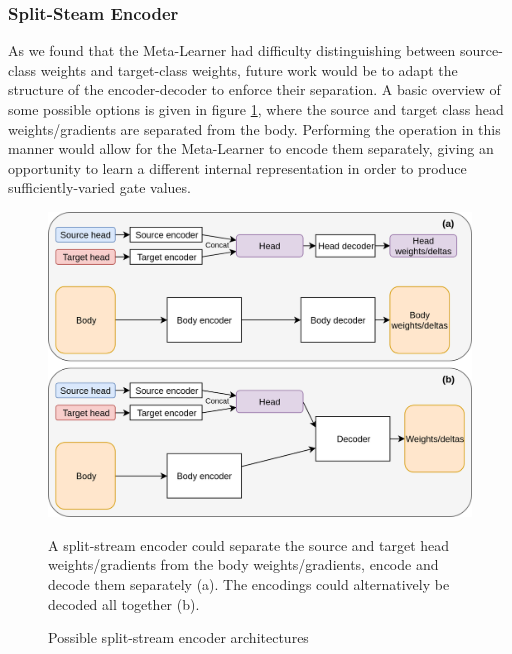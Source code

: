 \documentclass{report}
\begin{document}
\subsubsection{Split-Steam Encoder}
As we found that the Meta-Learner had difficulty distinguishing between source-class weights and target-class weights, future work would be to adapt the structure of the encoder-decoder to enforce their separation. A basic overview of some possible options is given in figure \ref{fig:split-stream:1}, where the source and target class head weights/gradients are separated from the body. Performing the operation in this manner would allow for the Meta-Learner to encode them separately, giving an opportunity to learn a different internal representation in order to produce sufficiently-varied gate values.

\begin{figure}[!h]
	\centering
	\includegraphics[width=13cm]{split-stream}
	\caption{Possible split-stream encoder architectures}
	\label{fig:split-stream:1}
	A split-stream encoder could separate the source and target head weights/gradients from the body weights/gradients, encode and decode them separately (a). The encodings could alternatively be decoded all together (b).
\end{figure}




\printbibliography
\end{document}
